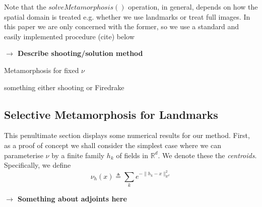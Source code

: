 \documentclass{article}
\newcommand{\Rd}{\mathbb{R}^{d}}
\begin{document}
Note that the $solveMetamorphosis()$ operation, in general, depends on how the
spatial domain is treated e.g. whether we use landmarks or treat full images.
In this paper we are only concerned with the former, so we use a standard and
easily implemented procedure (cite) below 

\textbf{$\longrightarrow$ Describe shooting/solution method}\\
\begin{algorithm}[h!]
\begin{algorithmic}
\caption{Metamorphosis for fixed $\nu$}
\State something either shooting or Firedrake
\EndProcedure
\end{algorithmic}
\end{algorithm}

\subsection{Selective Metamorphosis for Landmarks}\label{sec:numerical}

This penultimate section displays some numerical results for our method. First,
as a proof of concept we shall consider the simplest case where we can
parameterise $\nu$ by a finite family $h_k$ of fields in $\Rd$. We denote these
the \textit{centroids}. Specifically, we define
\begin{equation}
\nu_h (x) \triangleq \sum_k e^{-\|h_k - x\|_{\Rd}^2}
\end{equation}

\textbf{$\longrightarrow$ Something about adjoints here}\\




\end{document}
